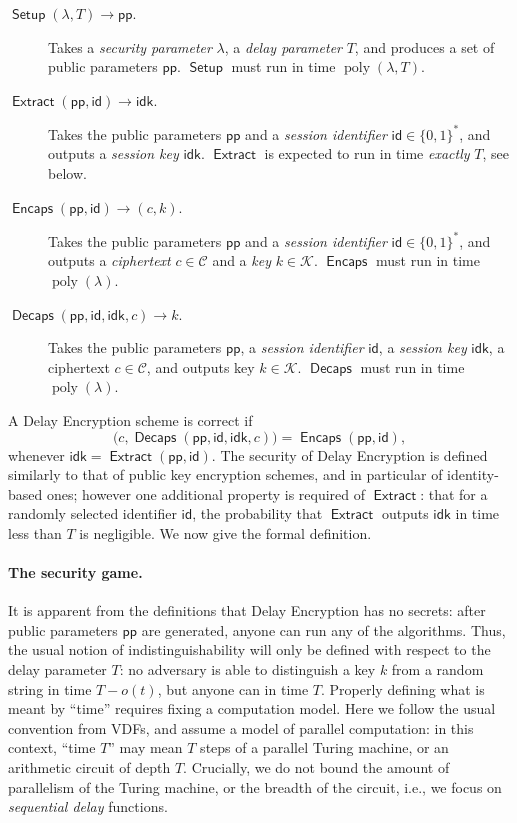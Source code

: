 \documentclass{llncs}
\DeclareMathOperator{\poly}{poly}
\DeclareMathOperator{\Setup}{\mathsf{Setup}}
\DeclareMathOperator{\Extract}{\mathsf{Extract}}
\DeclareMathOperator{\Encaps}{\mathsf{Encaps}}
\DeclareMathOperator{\Decaps}{\mathsf{Decaps}}
\newcommand{\pp}{\mathsf{pp}}
\newcommand{\id}{\mathsf{id}}
\newcommand{\idk}{\mathsf{idk}}
\newcommand{\keyspace}{\mathcal{K}}
\newcommand{\cipherspace}{\mathcal{C}}
\begin{document}
\begin{description}
\item[$\Setup(\lambda, T) \to \pp$.] %
  Takes a \emph{security parameter} $\lambda$, a \emph{delay
    parameter} $T$, and produces a set of public parameters $\pp$. %
  $\Setup$ must run in time $\poly(\lambda,T)$.
\item[$\Extract(\pp,\id) \to \idk$.] %
  Takes the public parameters $\pp$ and a \emph{session identifier}
  $\id\in\{0,1\}^*$, and outputs a \emph{session key} $\idk$. %
  $\Extract$ is expected to run in time \emph{exactly} $T$, see below.
\item[$\Encaps(\pp,\id)\to (c,k)$.] %
  Takes the public parameters $\pp$ and a \emph{session identifier}
  $\id\in\{0,1\}^*$, and outputs a \emph{ciphertext}
  $c\in\cipherspace$ and a \emph{key} $k\in\keyspace$. %
  $\Encaps$ must run in time $\poly(\lambda)$.
\item[$\Decaps(\pp,\id,\idk,c)\to k$.] %
  Takes the public parameters $\pp$, a \emph{session identifier}
  $\id$, a \emph{session key} $\idk$, a ciphertext $c\in\cipherspace$,
  and outputs key $k\in\keyspace$. %
  $\Decaps$ must run in time $\poly(\lambda)$.
\end{description}

A Delay Encryption scheme is correct if
\[\bigl(c,\Decaps(\pp,\id,\idk,c)\bigr) = \Encaps(\pp,\id),\]
whenever $\idk=\Extract(\pp,\id)$. %
The security of Delay Encryption is defined similarly to that of
public key encryption schemes, and in particular of identity-based
ones; however one additional property is required of $\Extract$: that
for a randomly selected identifier $\id$, the probability that
$\Extract$ outputs $\idk$ in time less than $T$ is negligible. %
We now give the formal definition.

\paragraph{The security game.} It is apparent from the definitions
that Delay Encryption has no secrets: after public parameters $\pp$
are generated, anyone can run any of the algorithms. %
Thus, the usual notion of indistinguishability will only be defined
with respect to the delay parameter $T$: no adversary is able to
distinguish a key $k$ from a random string in time $T-o(t)$, but
anyone can in time $T$. %
Properly defining what is meant by ``time'' requires fixing a
computation model. %
Here we follow the usual convention from VDFs, and assume a model of
parallel computation: in this context, ``time $T$'' may mean $T$ steps
of a parallel Turing machine, or an arithmetic circuit of depth $T$. %
Crucially, we do not bound the amount of parallelism of the Turing
machine, or the breadth of the circuit, i.e., we focus on
\emph{sequential delay} functions.
\end{document}
